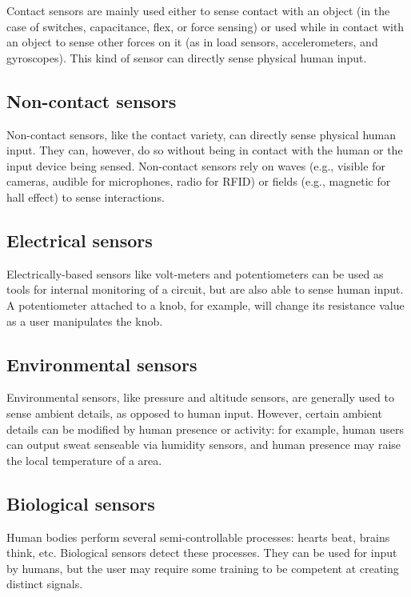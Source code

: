 Contact sensors are mainly used either to sense contact with an object (in the case of switches, capacitance, flex, or force sensing) or used while in contact with an object to sense other forces on it (as in load sensors, accelerometers, and gyroscopes). This kind of sensor can directly sense physical human input.

\subsection{Non-contact sensors}

Non-contact sensors, like the contact variety, can directly sense physical human input. They can, however, do so without being in contact with the human or the input device being sensed. Non-contact sensors rely on waves (e.g., visible for cameras, audible for microphones, radio for RFID) or fields (e.g., magnetic for hall effect) to sense interactions. 

\subsection{Electrical sensors}

Electrically-based sensors like volt-meters and potentiometers can be used as tools for internal monitoring of a circuit, but are also able to sense human input. A potentiometer attached to a knob, for example, will change its resistance value as a user manipulates the knob.

\subsection{Environmental sensors}

Environmental sensors, like pressure and altitude sensors, are generally used to sense ambient details, as opposed to human input. However, certain ambient details can be modified by human presence or activity: for example, human users can output sweat senseable via humidity sensors, and human presence may raise the local temperature of a area.

\subsection{Biological sensors}

Human bodies perform several semi-controllable processes: hearts beat, brains think, etc. Biological sensors detect these processes. They can be used for input by humans, but the user may require some training to be competent at creating distinct signals.

